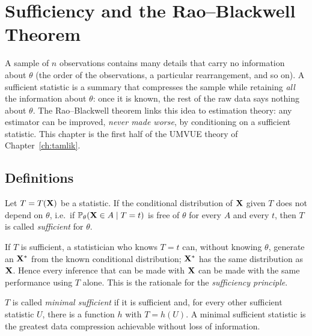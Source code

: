 \documentclass[main.tex]{subfiles}
\begin{document}
\chapter{Sufficiency and the Rao--Blackwell Theorem}\label{ch:yeterlilik}

A sample of $n$ observations contains many details that carry no information about $\theta$ (the order of the observations, a particular rearrangement, and so on). A sufficient statistic is a summary that compresses the sample while retaining \emph{all} the information about $\theta$: once it is known, the rest of the raw data says nothing about $\theta$. The Rao--Blackwell theorem links this idea to estimation theory: any estimator can be improved, \emph{never made worse}, by conditioning on a sufficient statistic. This chapter is the first half of the UMVUE theory of Chapter~\ref{ch:tamlik}.

\section{Definitions}

\begin{definition}\label{def:yeterli}
Let $T=T(\mathbf{X})$ be a statistic. If the conditional distribution of $\mathbf{X}$ given $T$ does not depend on $\theta$, i.e.\ if $\mathbb{P}_\theta(\mathbf{X}\in A\mid T=t)$ is free of $\theta$ for every $A$ and every $t$, then $T$ is called \emph{sufficient} for $\theta$.
\end{definition}

\begin{remark}[Interpretation]
If $T$ is sufficient, a statistician who knows $T=t$ can, without knowing $\theta$, generate an $\mathbf{X}^*$ from the known conditional distribution; $\mathbf{X}^*$ has the same distribution as $\mathbf{X}$. Hence every inference that can be made with $\mathbf{X}$ can be made with the same performance using $T$ alone. This is the rationale for the \emph{sufficiency principle}.
\end{remark}

\begin{definition}
$T$ is called \emph{minimal sufficient} if it is sufficient and, for every other sufficient statistic $U$, there is a function $h$ with $T=h(U)$. A minimal sufficient statistic is the greatest data compression achievable without loss of information.
\end{definition}
\end{document}
